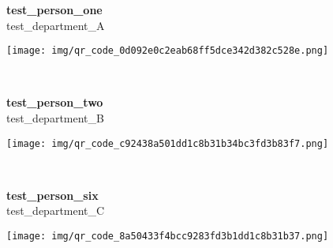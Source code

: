 \documentclass{article}
\begin{document}
\begin{minipage}{0.20\textwidth}  %
    \textbf{test_person_one} \\
    test_department_A
\end{minipage}%
\hspace{0.05\textwidth}%
\begin{minipage}{0.25\textwidth}
    \texttt{[image: img/qr\_code\_0d092e0c2eab68ff5dce342d382c528e.png]}
\end{minipage}\
\
\begin{minipage}{0.20\textwidth}  %
    \textbf{test_person_two} \\
    test_department_B
\end{minipage}%
\hspace{0.05\textwidth}%
\begin{minipage}{0.25\textwidth}
    \texttt{[image: img/qr\_code\_c92438a501dd1c8b31b34bc3fd3b83f7.png]}
\end{minipage}\

\begin{minipage}{0.20\textwidth}  %
    \textbf{test_person_six} \\
    test_department_C
\end{minipage}%
\hspace{0.05\textwidth}%
\begin{minipage}{0.25\textwidth}
    \texttt{[image: img/qr\_code\_8a50433f4bcc9283fd3b1dd1c8b31b37.png]}
\end{minipage}\
\
\end{document}
